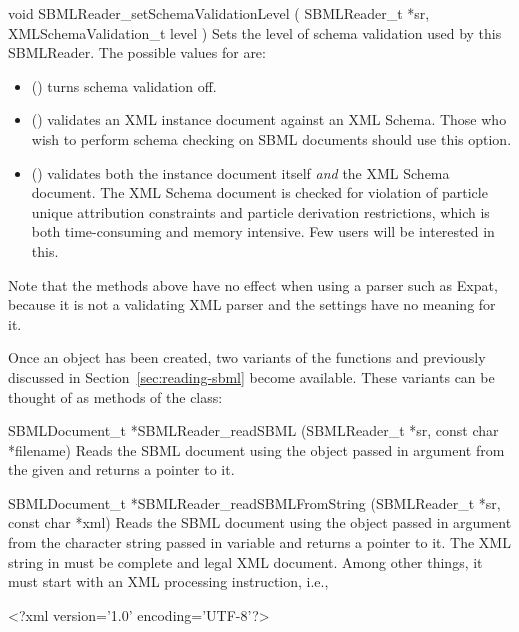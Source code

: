 \documentclass{sbmlmanual}
\begin{document}
\begin{methoddef}{void SBMLReader\_setSchemaValidationLevel ( SBMLReader\_t *sr,
XMLSchemaValidation\_t level )}
  Sets the level of schema validation used by this SBMLReader.
  The possible values for  are:
  \begin{itemize}
  \item {} () turns schema
    validation off.
    
  \item {} () validates an XML
    instance document against an XML Schema.  Those who wish to perform
    schema checking on SBML documents should use this option.
    
  \item {} () validates both the
    instance document itself \emph{and} the XML Schema document.  The XML
    Schema document is checked for violation of particle unique attribution
    constraints and particle derivation restrictions, which is both
    time-consuming and memory intensive.  Few users will be interested in
    this. 
  \end{itemize}
\end{methoddef}

Note that the  methods above have no effect when
using a parser such as Expat, because it is not a validating XML parser and
the settings have no meaning for it.

Once an  object has been created, two variants of the
functions  and  previously
discussed in Section~\ref{sec:reading-sbml} become available.  These
variants can be thought of as methods of the  class:


\begin{methoddef}{SBMLDocument\_t *SBMLReader\_readSBML (SBMLReader\_t *sr,
const char *filename)}
Reads the SBML document using the  object passed in
argument  from the given  and returns a
pointer to it.
\end{methoddef}

\begin{methoddef}{SBMLDocument\_t *SBMLReader\_readSBMLFromString (SBMLReader\_t *sr,\\
const char *xml)}
Reads the SBML document using the  object passed in
argument  from the character string passed in variable
 and returns a pointer to it.  The XML string in
 must be complete and legal XML document.  Among other
things, it must start with an XML processing instruction, i.e.,
  \begin{example}
    <?xml version='1.0' encoding='UTF-8'?>
  \end{example}
\end{methoddef}
\end{document}
